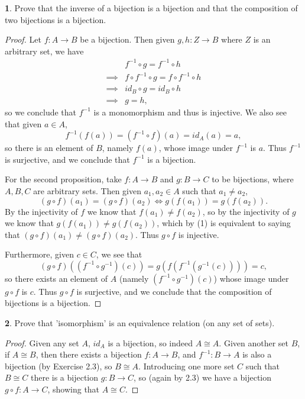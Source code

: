 \documentclass{article}
\newcounter{section-number}
\theoremstyle{definition}
\newtheorem{ex}{}[section-number]
\begin{document}
\begin{ex}
	Prove that the inverse of a bijection is a bijection and that the composition of two bijections is a bijection.
\end{ex}
\begin{proof}
	Let $f: A \to B$ be a bijection.
	Then given $g, h: Z \to B$ where $Z$ is an arbitrary set, we have \begin{align*}
		         & f^{-1}\circ g = f^{-1} \circ h                  \\
		\implies & f \circ f^{-1} \circ g = f \circ f^{-1} \circ h \\
		\implies & id_B \circ g = id_B \circ h                     \\
		\implies & g = h,
	\end{align*}
	so we conclude that $f^{-1}$ is a monomorphism and thus is injective.
	We also see that given $a \in A$, \begin{equation*}
		f^{-1}(f(a)) = (f^{-1} \circ f)(a) = id_A(a) = a,
	\end{equation*}
	so there is an element of $B$, namely $f(a)$, whose image under $f^{-1}$ is $a$.
	Thus $f^{-1}$ is surjective, and we conclude that $f^{-1}$ is a bijection.

	For the second proposition, take $f: A \to B$ and $g: B \to C$ to be bijections, where $A, B, C$ are arbitrary sets.
	Then given $a_1, a_2 \in A$ such that $a_1 \neq a_2$, \begin{equation}
		(g \circ f)(a_1) = (g \circ f)(a_2) \iff  g(f(a_1)) = g(f(a_2)).
	\end{equation}
	By the injectivity of $f$ we know that $f(a_1) \neq f(a_2)$, so by the injectivity of $g$ we know that $g(f(a_1)) \neq g(f(a_2))$, which by (1) is equivalent to saying that $(g \circ f)(a_1) \neq (g \circ f)(a_2)$.
	Thus $g \circ f$ is injective.

	Furthermore, given $c \in C$, we see that \begin{equation*}
		(g \circ f)((f^{-1} \circ g^{-1})(c)) = g(f(f^{-1}(g^{-1}(c)))) = c,
	\end{equation*}
	so there exists an element of $A$ (namely $(f^{-1} \circ g^{-1})(c)$) whose image under $g \circ f$ is $c$.
	Thus $g \circ f$ is surjective, and we conclude that the composition of bijections is a bijection.
\end{proof}

\begin{ex}
	Prove that 'isomorphism' is an equivalence relation (on any set of sets).
\end{ex}
\begin{proof}
	Given any set $A$, $id_A$ is a bijection, so indeed $A \cong A$.
	Given another set $B$, if $A \cong B$, then there exists a bijection $f: A \to B$, and $f^{-1}: B \to A$ is also a bijection (by Exercise 2.3), so $B \cong A$.
	Introducing one more set $C$ such that $B \cong C$ there is a bijection $g: B \to C$, so (again by 2.3) we have a bijection $g \circ f: A \to C$, showing that $A \cong C$.
\end{proof}
\end{document}

